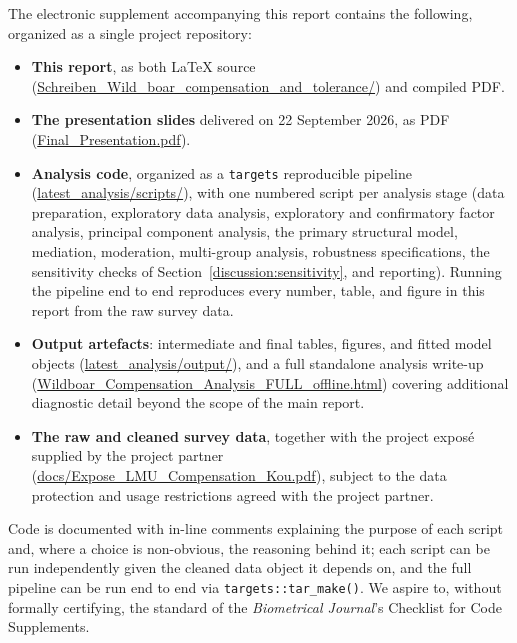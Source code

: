 The electronic supplement accompanying this report contains the following,
organized as a single project repository:

\begin{sloppypar}
\begin{itemize}
  \item \textbf{This report}, as both LaTeX source
    (\url{Schreiben_Wild_boar_compensation_and_tolerance/}) and
    compiled PDF.
  \item \textbf{The presentation slides} delivered on 22 September 2026, as
    PDF (\url{Final_Presentation.pdf}).
  \item \textbf{Analysis code}, organized as a \texttt{targets} reproducible
    pipeline (\url{latest_analysis/scripts/}), with one numbered script
    per analysis stage (data preparation, exploratory data analysis,
    exploratory and confirmatory factor analysis, principal component
    analysis, the primary structural model, mediation, moderation,
    multi-group analysis, robustness specifications, the sensitivity checks
    of Section~\ref{discussion:sensitivity}, and reporting).
    Running the pipeline end to end reproduces every number, table, and
    figure in this report from the raw survey data.
  \item \textbf{Output artefacts}: intermediate and final tables, figures,
    and fitted model objects (\url{latest_analysis/output/}), and a full
    standalone analysis write-up
    (\url{Wildboar_Compensation_Analysis_FULL_offline.html}) covering
    additional diagnostic detail beyond the scope of the main report.
  \item \textbf{The raw and cleaned survey data}, together with the project
    exposé supplied by the project partner
    (\url{docs/Expose_LMU_Compensation_Kou.pdf}), subject to the data
    protection and usage restrictions agreed with the project partner.
\end{itemize}
\end{sloppypar}

Code is documented with in-line comments explaining the purpose of each
script and, where a choice is non-obvious, the reasoning behind it; each
script can be run independently given the cleaned data object it depends on,
and the full pipeline can be run end to end via \texttt{targets::tar\_make()}.
We aspire to, without formally certifying, the standard of the
\emph{Biometrical Journal}'s Checklist for Code Supplements.

